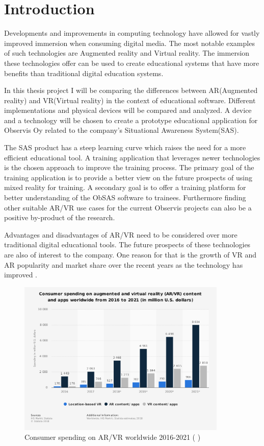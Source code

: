 \documentclass[12pt, a4paper,oneside, nocenter]{thesis}
\newcommand{\citeyeartitlexamkinline}[1]{(\usebibentry{#1}{title} \citeyear{#1})}
\begin{document}
\chapter{\texorpdfstring{Introduction}{introduction}}
Developments and improvements in computing technology have allowed for vastly improved immersion when consuming digital media. The most notable examples of such technologies are Augmented reality and Virtual reality. The immersion these technologies offer can be used to create educational systems that have more benefits than traditional digital education systems. \par
In this thesis project I will be comparing the differences between AR(Augmented reality) and VR(Virtual reality) in the context of educational software. Different implementations and physical devices will be compared and analyzed. A device and a technology will be chosen to create a prototype educational application for Observis Oy related to the company's Situational Awareness System(SAS).
\par
The SAS product has a steep learning curve which raises the need for a more efficient educational tool. A training application that leverages newer technologies is the chosen approach to improve the training process. The primary goal of the training application is to provide a better view on the future prospects of using mixed reality for training. A secondary goal is to offer a training platform for better understanding of the ObSAS software to trainees. Furthermore finding other suitable AR/VR use cases for the current Observis projects can also be a positive by-product of the research.
\par
Advantages and disadvantages of AR/VR need to be considered over more traditional digital educational tools. The future prospects of these technologies are also of interest to the company. One reason for that is the growth of VR and AR popularity and market share over the recent years as the technology has improved .
\begin{figure}[H]
	\centering
	\includegraphics[height=210pt]{ar-vr-consumer-spending}
	\caption{Consumer spending on AR/VR worldwide 2016-2021 \citeyeartitlexamkinline{ar-vr-chart}}
	\label{fig:ar-vr-consumer-spending}
\end{figure}
\end{document}
